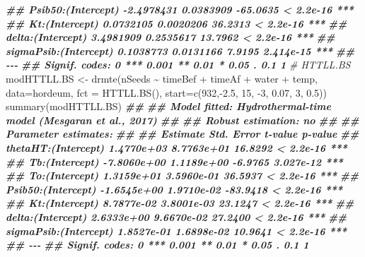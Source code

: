 \documentclass[
]{book}
\newenvironment{Shaded}{\begin{snugshade}}{\end{snugshade}}
\newcommand{\AttributeTok}[1]{\textcolor[rgb]{0.77,0.63,0.00}{#1}}
\newcommand{\CommentTok}[1]{\textcolor[rgb]{0.56,0.35,0.01}{\textit{#1}}}
\newcommand{\DecValTok}[1]{\textcolor[rgb]{0.00,0.00,0.81}{#1}}
\newcommand{\DocumentationTok}[1]{\textcolor[rgb]{0.56,0.35,0.01}{\textbf{\textit{#1}}}}
\newcommand{\FloatTok}[1]{\textcolor[rgb]{0.00,0.00,0.81}{#1}}
\newcommand{\FunctionTok}[1]{\textcolor[rgb]{0.00,0.00,0.00}{#1}}
\newcommand{\NormalTok}[1]{#1}
\newcommand{\OtherTok}[1]{\textcolor[rgb]{0.56,0.35,0.01}{#1}}
\newcommand{\SpecialCharTok}[1]{\textcolor[rgb]{0.00,0.00,0.00}{#1}}
\begin{document}
\begin{Shaded}
\begin{Highlighting}[]
\DocumentationTok{\#\# Psib50:(Intercept)     {-}2.4978431   0.0383909 {-}65.0635 \textless{} 2.2e{-}16 ***}
\DocumentationTok{\#\# Kt:(Intercept)          0.0732105   0.0020206  36.2313 \textless{} 2.2e{-}16 ***}
\DocumentationTok{\#\# delta:(Intercept)       3.4981909   0.2535617  13.7962 \textless{} 2.2e{-}16 ***}
\DocumentationTok{\#\# sigmaPsib:(Intercept)   0.1038773   0.0131166   7.9195 2.414e{-}15 ***}
\DocumentationTok{\#\# {-}{-}{-}}
\DocumentationTok{\#\# Signif. codes:  0 \textquotesingle{}***\textquotesingle{} 0.001 \textquotesingle{}**\textquotesingle{} 0.01 \textquotesingle{}*\textquotesingle{} 0.05 \textquotesingle{}.\textquotesingle{} 0.1 \textquotesingle{} \textquotesingle{} 1}
\CommentTok{\# HTTLL.BS}
\NormalTok{modHTTLL.BS }\OtherTok{\textless{}{-}} \FunctionTok{drmte}\NormalTok{(nSeeds }\SpecialCharTok{\textasciitilde{}}\NormalTok{ timeBef }\SpecialCharTok{+}\NormalTok{ timeAf }\SpecialCharTok{+}\NormalTok{ water }\SpecialCharTok{+}\NormalTok{ temp,}
                 \AttributeTok{data=}\NormalTok{hordeum,}
                 \AttributeTok{fct =} \FunctionTok{HTTLL.BS}\NormalTok{(),}
  \AttributeTok{start=}\FunctionTok{c}\NormalTok{(}\DecValTok{932}\NormalTok{,}\SpecialCharTok{{-}}\FloatTok{2.5}\NormalTok{, }\DecValTok{15}\NormalTok{, }\SpecialCharTok{{-}}\DecValTok{3}\NormalTok{, }\FloatTok{0.07}\NormalTok{, }\DecValTok{3}\NormalTok{, }\FloatTok{0.5}\NormalTok{))}
\FunctionTok{summary}\NormalTok{(modHTTLL.BS)}
\DocumentationTok{\#\# }
\DocumentationTok{\#\# Model fitted: Hydrothermal{-}time model (Mesgaran et al., 2017)}
\DocumentationTok{\#\# }
\DocumentationTok{\#\# Robust estimation: no }
\DocumentationTok{\#\# }
\DocumentationTok{\#\# Parameter estimates:}
\DocumentationTok{\#\# }
\DocumentationTok{\#\#                          Estimate  Std. Error  t{-}value   p{-}value    }
\DocumentationTok{\#\# thetaHT:(Intercept)    1.4770e+03  8.7763e+01  16.8292 \textless{} 2.2e{-}16 ***}
\DocumentationTok{\#\# Tb:(Intercept)        {-}7.8060e+00  1.1189e+00  {-}6.9765 3.027e{-}12 ***}
\DocumentationTok{\#\# To:(Intercept)         1.3159e+01  3.5960e{-}01  36.5937 \textless{} 2.2e{-}16 ***}
\DocumentationTok{\#\# Psib50:(Intercept)    {-}1.6545e+00  1.9710e{-}02 {-}83.9418 \textless{} 2.2e{-}16 ***}
\DocumentationTok{\#\# Kt:(Intercept)         8.7877e{-}02  3.8001e{-}03  23.1247 \textless{} 2.2e{-}16 ***}
\DocumentationTok{\#\# delta:(Intercept)      2.6333e+00  9.6670e{-}02  27.2400 \textless{} 2.2e{-}16 ***}
\DocumentationTok{\#\# sigmaPsib:(Intercept)  1.8527e{-}01  1.6898e{-}02  10.9641 \textless{} 2.2e{-}16 ***}
\DocumentationTok{\#\# {-}{-}{-}}
\DocumentationTok{\#\# Signif. codes:  0 \textquotesingle{}***\textquotesingle{} 0.001 \textquotesingle{}**\textquotesingle{} 0.01 \textquotesingle{}*\textquotesingle{} 0.05 \textquotesingle{}.\textquotesingle{} 0.1 \textquotesingle{} \textquotesingle{} 1}
\end{Highlighting}
\end{Shaded}
\end{document}

